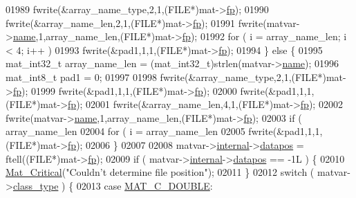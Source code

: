 \begin{DoxyCode}
{{{{{{{{{{{{{{{{01989         fwrite(&array\_name\_type,2,1,(FILE*)mat->\hyperlink{struct__mat__t_a85f562e407ca9ad4d2a6e14f839432b7}{fp});
01990         fwrite(&array\_name\_len,2,1,(FILE*)mat->\hyperlink{struct__mat__t_a85f562e407ca9ad4d2a6e14f839432b7}{fp});
01991         fwrite(matvar->\hyperlink{group___m_a_t_a5d4b55b041e3b4fb50c04337f05ad909}{name},1,array\_name\_len,(FILE*)mat->\hyperlink{struct__mat__t_a85f562e407ca9ad4d2a6e14f839432b7}{fp});
01992         \textcolor{keywordflow}{for} ( i = array\_name\_len; i < 4; i++ )
01993             fwrite(&pad1,1,1,(FILE*)mat->\hyperlink{struct__mat__t_a85f562e407ca9ad4d2a6e14f839432b7}{fp});
01994     \} \textcolor{keywordflow}{else} \{
01995         mat\_int32\_t array\_name\_len = (mat\_int32\_t)strlen(matvar->\hyperlink{group___m_a_t_a5d4b55b041e3b4fb50c04337f05ad909}{name});
01996         mat\_int8\_t  pad1 = 0;
01997 
01998         fwrite(&array\_name\_type,2,1,(FILE*)mat->\hyperlink{struct__mat__t_a85f562e407ca9ad4d2a6e14f839432b7}{fp});
01999         fwrite(&pad1,1,1,(FILE*)mat->\hyperlink{struct__mat__t_a85f562e407ca9ad4d2a6e14f839432b7}{fp});
02000         fwrite(&pad1,1,1,(FILE*)mat->\hyperlink{struct__mat__t_a85f562e407ca9ad4d2a6e14f839432b7}{fp});
02001         fwrite(&array\_name\_len,4,1,(FILE*)mat->\hyperlink{struct__mat__t_a85f562e407ca9ad4d2a6e14f839432b7}{fp});
02002         fwrite(matvar->\hyperlink{group___m_a_t_a5d4b55b041e3b4fb50c04337f05ad909}{name},1,array\_name\_len,(FILE*)mat->\hyperlink{struct__mat__t_a85f562e407ca9ad4d2a6e14f839432b7}{fp});
02003         \textcolor{keywordflow}{if} ( array\_name\_len %
02004             \textcolor{keywordflow}{for} ( i = array\_name\_len %
02005                 fwrite(&pad1,1,1,(FILE*)mat->\hyperlink{struct__mat__t_a85f562e407ca9ad4d2a6e14f839432b7}{fp});
02006     \}
02007 
02008     matvar->\hyperlink{group___m_a_t_a6e97e3ed9f40c49322c18561c2a94e92}{internal}->\hyperlink{structmatvar__internal_afd3bfaab126a160bd6855563e1ea0a7e}{datapos} = ftell((FILE*)mat->\hyperlink{struct__mat__t_a85f562e407ca9ad4d2a6e14f839432b7}{fp});
02009     \textcolor{keywordflow}{if} ( matvar->\hyperlink{group___m_a_t_a6e97e3ed9f40c49322c18561c2a94e92}{internal}->\hyperlink{structmatvar__internal_afd3bfaab126a160bd6855563e1ea0a7e}{datapos} == -1L ) \{
02010         \hyperlink{group__mat__util_gaf51f2bfbb5580f575e4dd79757e2b80c}{Mat\_Critical}(\textcolor{stringliteral}{"Couldn't determine file position"});
02011     \}
02012     \textcolor{keywordflow}{switch} ( matvar->\hyperlink{group___m_a_t_aff13035bf3265dd7d9425e5d40c839d4}{class\_type} ) \{
02013         \textcolor{keywordflow}{case} \hyperlink{group___m_a_t_ggad4d60ae7b709fc81bfd744fb4c857c40a5d70e0862e5bdb7bd86bf7ba5948f307}{MAT\_C\_DOUBLE}:
}}}}}}}}}}}}}}}}
\end{DoxyCode}
